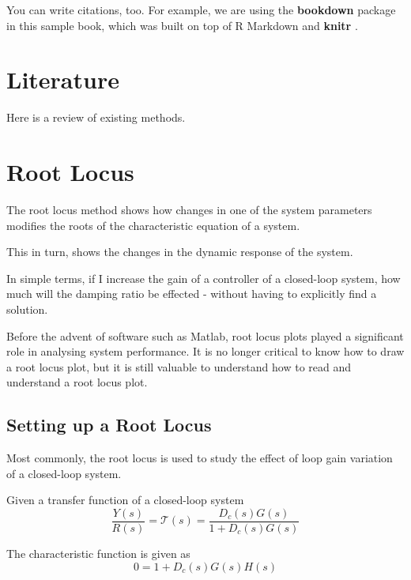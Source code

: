 \documentclass[
]{book}
\theoremstyle{definition}
\theoremstyle{definition}
\theoremstyle{definition}
\theoremstyle{remark}
\begin{document}
You can write citations, too. For example, we are using the \textbf{bookdown} package \citep{R-bookdown} in this sample book, which was built on top of R Markdown and \textbf{knitr} \citep{xie2015}.

\hypertarget{literature}{%
\chapter{Literature}\label{literature}}

Here is a review of existing methods.

\hypertarget{root-locus}{%
\chapter{Root Locus}\label{root-locus}}

The root locus method shows how changes in one of the system parameters modifies the roots of the characteristic equation of a system.

This in turn, shows the changes in the dynamic response of the system.

In simple terms, if I increase the gain of a controller of a closed-loop system, how much will the damping ratio be effected - without having to explicitly find a solution.

Before the advent of software such as Matlab, root locus plots played a significant role in analysing system performance. It is no longer critical to know how to draw a root locus plot, but it is still valuable to understand how to read and understand a root locus plot.

\hypertarget{setting-up-a-root-locus}{%
\section{Setting up a Root Locus}\label{setting-up-a-root-locus}}

Most commonly, the root locus is used to study the effect of loop gain variation of a closed-loop system.

Given a transfer function of a closed-loop system
\begin{equation}
\frac{Y(s)}{R(s)}=\mathcal{T}(s) = \frac{D_c(s)G(s)}{1+D_c(s)G(s)}
\end{equation}

The characteristic function is given as
\begin{equation}
0 = 1 + D_c(s)G(s)H(s)
\end{equation}
\end{document}
